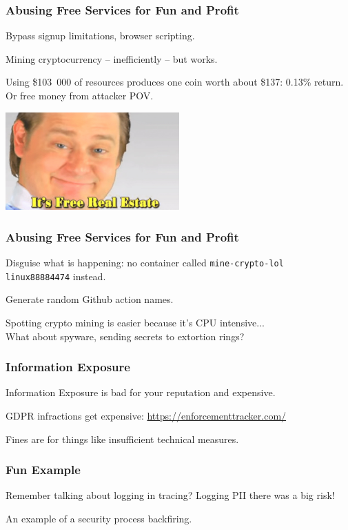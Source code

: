 \begin{frame}
\frametitle{Abusing Free Services for Fun and Profit}

Bypass signup limitations, browser scripting.

Mining cryptocurrency -- inefficiently -- but works.


Using \$103~000 of resources produces one coin worth about \$137: 0.13\% return.\\
\quad Or free money from attacker POV.

\begin{center}
	\includegraphics[width=0.5\textwidth]{images/freerealestate.jpg}
\end{center}

\end{frame}


\begin{frame}
\frametitle{Abusing Free Services for Fun and Profit}

Disguise what is happening: no container called \texttt{mine-crypto-lol}\\
\quad \texttt{linux88884474} instead.

Generate random Github action names.

Spotting crypto mining is easier because it's CPU intensive...\\
\quad What about spyware, sending secrets to extortion rings?


\end{frame}



\begin{frame}
\frametitle{Information Exposure}

Information Exposure is bad for your reputation and expensive.

GDPR infractions get expensive: \url{https://enforcementtracker.com/}

Fines are for things like insufficient technical measures.

\end{frame}


\begin{frame}
\frametitle{Fun Example}

Remember talking about logging in tracing? Logging PII there was a big risk!

An example of a security process backfiring.


\end{frame}



